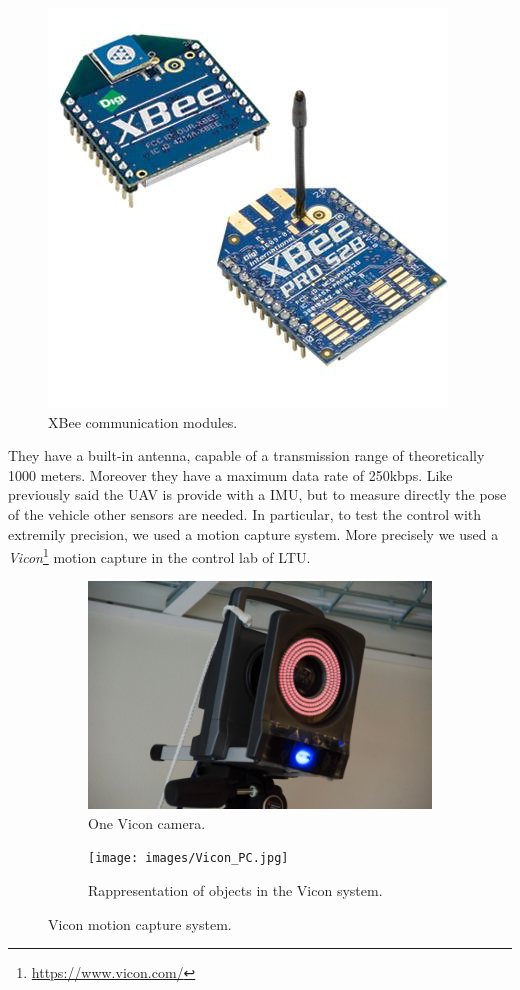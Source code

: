 \begin{figure}[h]
	\centering
	\includegraphics[scale = 0.6]{./images/XBee.jpg}
	\caption{XBee communication modules.}
	\label{fig:XBee}
\end{figure}

\noindent They have a built-in antenna, capable of a transmission range of theoretically 1000 meters. Moreover they have a maximum data rate of 250kbps. Like previously said the UAV is provide with a IMU, but to measure directly the pose of the vehicle other sensors are needed. In particular, to test the control with extremily precision, we used a motion capture system. More precisely we used a \textit{Vicon}\footnote{\url{https://www.vicon.com/}} motion capture in the control lab of LTU.

\begin{figure}[h]
	\centering
	\begin{subfigure}[t]{0.49\textwidth}
		\centering
		\includegraphics[scale = 0.25]{images/Vicon_camera.jpg}
		\caption{One Vicon camera.}
		\label{subfig:vicon1}
	\end{subfigure} 
	\begin{subfigure}[t]{0.49\textwidth}
		\centering
		\texttt{[image: images/Vicon\_PC.jpg]}
		\caption{Rappresentation of objects in the Vicon system.}
		\label{subfig:vicon2}
	\end{subfigure}
	\caption{Vicon motion capture system.}
	\label{fig:vicon}
\end{figure}

